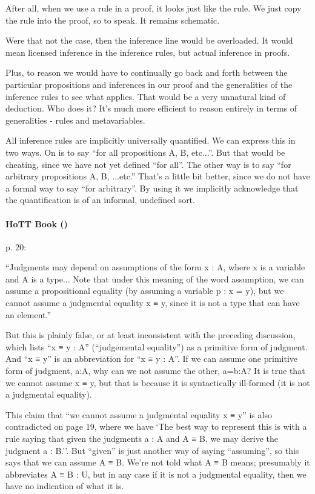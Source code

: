 After all, when we use a rule in a proof, it looks just like the rule.
We just copy the rule into the proof, so to speak. It remains schematic.

Were that not the case, then the inference line would be overloaded.
It would mean licensed inference in the inference rules, but actual
inference in proofs.

Plus, to reason we would have to continually go back and forth between
the particular propositions and inferences in our proof and the
generalities of the inference rules to see what applies. That would be
a very unnatural kind of deduction. Who does it? It's much more
efficient to reason entirely in terms of generalities - rules and
metavariables.

All inference rules are implicitly universally quantified. We can
express this in two ways. On is to say ``for all propositions A, B,
etc...''. But that would be cheating, since we have not yet defined
``for all''. The other way is to say ``for arbitrary propositions A,
B, ...etc.'' That's a little bit better, since we do not have a formal
way to say ``for arbitrary''. By using it we implicitly acknowledge
that the quantification is of an informal, undefined sort.

\paragraph{HoTT Book (\parencite{hottbook})\newline}

p. 20:
\begin{displayquote}
``Judgments may depend on assumptions of the form x :
A, where x is a variable and A is a type... Note that under this
meaning of the word assumption, we can assume a propositional equality
(by assuming a variable p : x = y), but we cannot assume a judgmental
equality x ≡ y, since it is not a type that can have an element.''
\end{displayquote}

But this is plainly false, or at least inconsistent with the preceding
discussion, which lists ``x ≡ y : A'' (``judgemental equality'') as a
primitive form of judgment. And ``x ≡ y'' is an abbreviation for ``x ≡
y : A''. If we can assume one primitive form of judgment, a:A, why can
we not assume the other, a=b:A? It is true that we cannot assume x ≡
y, but that is because it is syntactically ill-formed (it is not a
judgmental equality).

This claim that ``we cannot assume a judgmental equality x ≡ y'' is
also contradicted on page 19, where we have `The best way to represent
this is with a rule saying that given the judgments a : A and A ≡ B,
we may derive the judgment a : B.''. But ``given'' is just another way
of saying ``assuming'', so this says that we can assume A ≡ B. We're
not told what A ≡ B means; presumably it abbreviates A ≡ B : U, but in
any case if it is not a judgmental equality, then we have no
indication of what it is.


